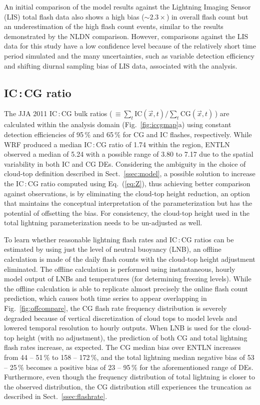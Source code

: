 An initial comparison of the model results against the Lightning Imaging
Sensor (LIS) total flash data also shows a high bias ($\sim2.3\times$) in
overall flash count but an underestimation of the high flash count events,
similar to the results demonstrated by the NLDN comparison. However,
comparisons against the LIS data for this study have a low confidence level
because of the relatively short time period simulated and the many
uncertainties, such as variable detection efficiency and shifting diurnal
sampling bias of LIS data, associated with the analysis.

\subsection{IC\,:\,CG ratio}\label{ssec:ratio}

The JJA 2011 IC\,:\,CG bulk ratios (\,$\equiv\sum_t \textrm{IC}(\vec{x},t)/\sum_t
\textrm{CG}(\vec{x},t)$\,) are calculated within the analysis domain
(Fig.~\ref{fig:iccgmap}a) using constant detection efficiencies of 95\,{\%}
and 65\,{\%} for CG and IC flashes, respectively. While WRF produced a median
IC\,:\,CG ratio of 1.74 within the region, ENTLN observed a median of 5.24
with a possible range of 3.80 to 7.17 due to the spatial variability in both
IC and CG DEs. Considering the ambiguity in the choice of cloud-top
definition described in Sect.~\ref{ssec:model}, a possible solution to
increase the IC\,:\,CG ratio computed using Eq.~(\ref{eq:Z}), thus achieving
better comparison against observations, is by eliminating the cloud-top
height reduction, an option that maintains the conceptual interpretation of
the parameterization but has the potential of offsetting the bias. For
consistency, the cloud-top height used in the total lightning
parameterization needs to be un-adjusted as well.

To learn whether reasonable lightning flash rates and IC\,:\,CG ratios can be
estimated by using just the level of neutral buoyancy (LNB), an offline
calculation is made of the daily flash counts with the cloud-top height
adjustment eliminated. The offline calculation is performed using
instantaneous, hourly model output of LNBs and temperatures (for determining
freezing levels). While the offline calculation is able to replicate almost
precisely the online flash count prediction, which causes both time series to
appear overlapping in Fig.~\ref{fig:offcompare}, the CG flash rate
frequency distribution is severely degraded because of vertical
discretization of cloud tops to model levels and lowered temporal resolution
to hourly outputs. When LNB is used for the cloud-top height (with no
adjustment), the prediction of both CG and total lightning flash rates
increase, as expected. The CG median bias over ENTLN increases from 44 --
51\,{\%} to 158 -- 172\,{\%}, and the total lightning median negative bias of
53 -- 25\,{\%} becomes a positive bias of 23 -- 95\,{\%} for the
aforementioned range of DEs. Furthermore, even though the frequency
distribution of total lightning is closer to the observed distribution, the
CG distribution still experiences the truncation as described in
Sect.~\ref{ssec:flashrate}.

